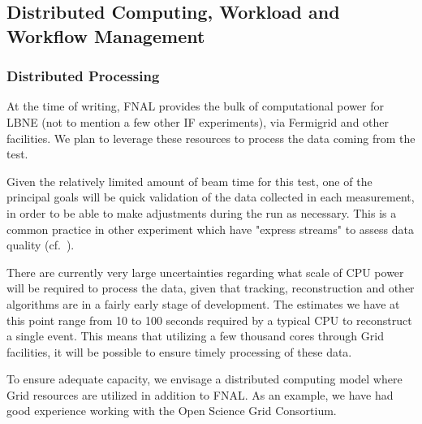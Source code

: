 \subsection{Distributed Computing, Workload and Workflow Management}
\subsubsection{Distributed Processing}
\label{distr_proc}
At the time of writing, FNAL provides the bulk of computational power for LBNE (not to mention a few other IF experiments), via Fermigrid and other facilities.
We plan to leverage these resources to process the data coming from the test.

Given the relatively limited amount of beam time for this test, one of the principal goals will be quick validation of the data collected in each measurement, in
order to be able to make adjustments during the run as necessary. This is a common practice in other experiment which have "express streams" to assess data
quality (cf.~\cite{atlas_express}).

There are currently very large uncertainties regarding what scale of CPU power will be required to process the data, given that tracking, reconstruction and
other algorithms are in a fairly early stage of development. The estimates we have at this point range from 10 to 100 seconds required by a typical
CPU to reconstruct a single event. This means that utilizing a few thousand cores through Grid facilities, it will be possible to ensure timely processing of these data.

To ensure adequate capacity, we envisage a distributed computing model where Grid resources are utilized in addition to FNAL.
As an example, we have had good experience working with the Open Science Grid Consortium.




